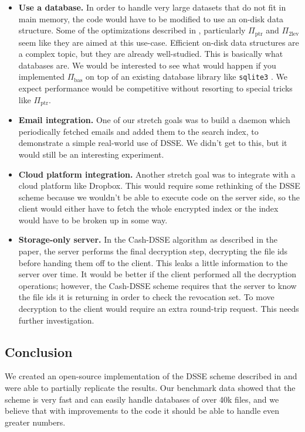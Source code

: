 \begin{itemize}
\item \textbf{Use a database.} In order to handle very large datasets that do not fit in main memory, the code would have to be modified to use an on-disk data structure. Some of the optimizations described in \cite{cash14}, particularly $\Pi_{\mathrm{ptr}}$ and $\Pi_{\mathrm{2lev}}$ seem like they are aimed at this use-case. Efficient on-disk data structures are a complex topic, but they are already well-studied. This is basically what databases are. We would be interested to see what would happen if you implemented $\Pi_{\mathrm{bas}}$ on top of an existing database library like \texttt{sqlite3} \cite{sqlite3}. We expect performance would be competitive without resorting to special tricks like $\Pi_{\mathrm{ptr}}$.

\item \textbf{Email integration.} One of our stretch goals was to build a daemon which periodically fetched emails and added them to the search index, to demonstrate a simple real-world use of DSSE. We didn't get to this, but it would still be an interesting experiment.

\item \textbf{Cloud platform integration.} Another stretch goal was to integrate with a cloud platform like Dropbox. This would require some rethinking of the DSSE scheme because we wouldn't be able to execute code on the server side, so the client would either have to fetch the whole encrypted index or the index would have to be broken up in some way.

\item \textbf{Storage-only server.} In the Cash-DSSE algorithm as described in the paper, the server performs the final decryption step, decrypting the file ids before handing them off to the client. This leaks a little information to the server over time. It would be better if the client performed all the decryption operations;  however, the Cash-DSSE scheme requires that the server to know the file ids it is returning in order to check the revocation set. To move decryption to the client would require an extra round-trip request. This needs further investigation.


\end{itemize}

\subsection{Conclusion}

We created an open-source implementation of the DSSE scheme described in \cite{cash14}
and were able to partially replicate the results.
Our benchmark data showed that the scheme is very fast and can easily handle databases of over 40k files, and we believe that with improvements to the code it should be able to handle even greater numbers.
